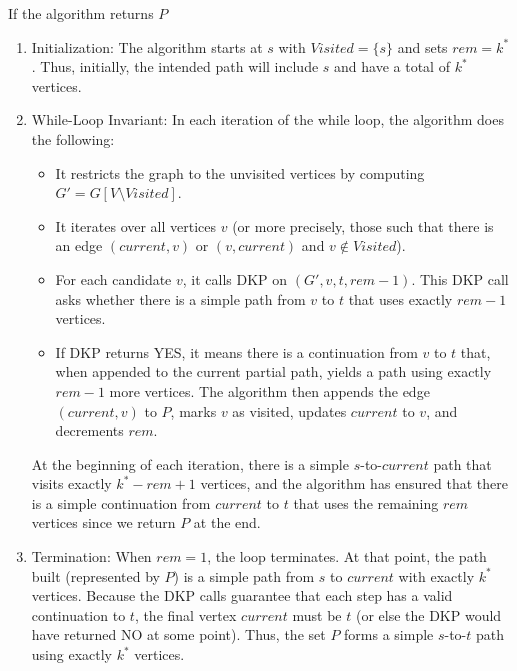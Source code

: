 \documentclass[12pt, letterpaper]{article}
\begin{document}
\begin{problemproof}
    If the algorithm returns \(P\)
    
    \begin{enumerate}
        \item Initialization:
           The algorithm starts at \(s\) with \(Visited = \{s\}\) and sets \(rem = k^*\). Thus, initially, the intended path will include \(s\) and have a total of \(k^*\) vertices.
        
        \item While-Loop Invariant: 
           In each iteration of the while loop, the algorithm does the following:
           \begin{itemize}
            \item It restricts the graph to the unvisited vertices by computing \(G' = G[V \setminus Visited]\).  
            \item It iterates over all vertices \(v\) (or more precisely, those such that there is an edge \((current,v)\) or \((v,current)\) and \(v \notin Visited\)).  
            \item For each candidate \(v\), it calls DKP on \((G', v, t, rem-1)\). This DKP call asks whether there is a simple path from \(v\) to \(t\) that uses exactly \(rem-1\) vertices.  
            \item If DKP returns YES, it means there is a continuation from \(v\) to \(t\) that, when appended to the current partial path, yields a path using exactly \(rem-1\) more vertices. The algorithm then appends the edge \((current,v)\) to \(P\), marks \(v\) as visited, updates \(current\) to \(v\), and decrements \(rem\).
           \end{itemize}
        
           At the beginning of each iteration, there is a simple \(s\)-to-\(current\) path that visits exactly \(k^* - rem + 1\) vertices, and the algorithm has ensured that there is a simple continuation from \(current\) to \(t\) that uses the remaining \(rem\) vertices since we return $P$ at the end.
        
        \item Termination: 
           When \(rem = 1\), the loop terminates. At that point, the path built (represented by \(P\)) is a simple path from \(s\) to \(current\) with exactly \(k^*\) vertices. Because the DKP calls guarantee that each step has a valid continuation to \(t\), the final vertex \(current\) must be \(t\) (or else the DKP would have returned NO at some point). Thus, the set \(P\) forms a simple \(s\)-to-\(t\) path using exactly \(k^*\) vertices.
    \end{enumerate}
    

\end{problemproof}
\end{document}
